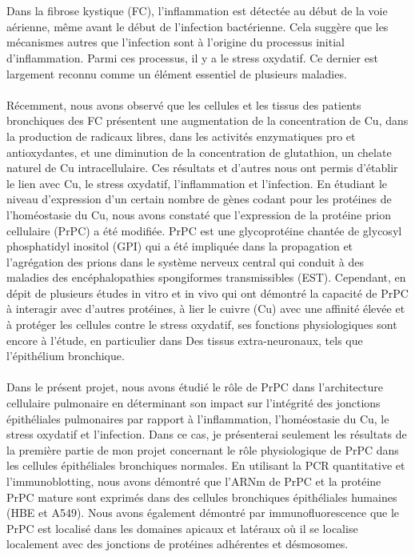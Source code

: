 %
\pdfbookmark[0]{\abstractname}{\abstractname}

\begingroup

\let\clearpage\relax
\let\cleardoublepage\relax
\let\cleardoublepage\relax

\chapter*{\abstractname}\label{sec:abstract}
\vspace*{-10mm}

Dans la fibrose kystique (FC), l'inflammation est détectée au début de la voie aérienne, même avant le début de l'infection bactérienne. Cela suggère que les mécanismes autres que l'infection sont à l'origine du processus initial d'inflammation. Parmi ces processus, il y a le stress oxydatif. Ce dernier est largement reconnu comme un élément essentiel de plusieurs maladies.\\
\\
Récemment, nous avons observé que les cellules et les tissus des patients bronchiques des FC présentent une augmentation de la concentration de Cu, dans la production de radicaux libres, dans les activités enzymatiques pro et antioxydantes, et une diminution de la concentration de glutathion, un chelate naturel de Cu intracellulaire. Ces résultats et d'autres nous ont permis d'établir le lien avec Cu, le stress oxydatif, l'inflammation et l'infection.
En étudiant le niveau d'expression d'un certain nombre de gènes codant pour les protéines de l'homéostasie du Cu, nous avons constaté que l'expression de la protéine prion cellulaire (PrPC) a été modifiée. PrPC est une glycoprotéine chantée de glycosyl phosphatidyl inositol (GPI) qui a été impliquée dans la propagation et l'agrégation des prions dans le système nerveux central qui conduit à des maladies des encéphalopathies spongiformes transmissibles (EST).
Cependant, en dépit de plusieurs études in vitro et in vivo qui ont démontré la capacité de PrPC à interagir avec d'autres protéines, à lier le cuivre (Cu) avec une affinité élevée et à protéger les cellules contre le stress oxydatif, ses fonctions physiologiques sont encore à l'étude, en particulier dans Des tissus extra-neuronaux, tels que l'épithélium bronchique.\\
\\
Dans le présent projet, nous avons étudié le rôle de PrPC dans l'architecture cellulaire pulmonaire en déterminant son impact sur l'intégrité des jonctions épithéliales pulmonaires par rapport à l'inflammation, l'homéostasie du Cu, le stress oxydatif et l'infection. Dans ce cas, je présenterai seulement les résultats de la première partie de mon projet concernant le rôle physiologique de PrPC dans les cellules épithéliales bronchiques normales. En utilisant la PCR quantitative et l'immunoblotting, nous avons démontré que l'ARNm de PrPC et la protéine PrPC mature sont exprimés dans des cellules bronchiques épithéliales humaines (HBE et A549). Nous avons également démontré par immunofluorescence que le PrPC est localisé dans les domaines apicaux et latéraux où il se localise localement avec des jonctions de protéines adhérentes et désmosomes.\\ 
